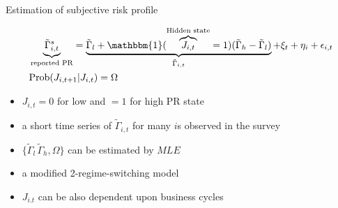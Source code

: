 \documentclass{beamer}
\begin{document}

\begin{frame}{Estimation of subjective 
risk profile}
\label{RegimeEstimation}

\begin{equation*}
	\begin{split}
&	\underbrace{\tilde \Gamma^s_{i,t}}_{\text{reported PR}} = \underbrace{\tilde \Gamma_l + \mathbbm{1}(\overbrace{J_{i,t}}^{\text{Hidden state}}= 1)( \tilde \Gamma_h -\tilde \Gamma_l)}_{\tilde \Gamma_{i,t}} +\xi_{t}+\eta_{i}+ \epsilon_{i,t}\\
& \text{Prob}(J_{i,t+1}|J_{i,t}) = \Omega
\end{split}
\end{equation*}

\begin{itemize}
	
	\item $J_{i,t} =0$ for low and $=1$ for high PR state
	\item a short time series of $\tilde \Gamma_ {i,t}$ for many $i$s observed in the survey 
	\item $\{\tilde \Gamma_l\,\tilde \Gamma_h,\Omega\}$ can be estimated by $MLE$
	\item a modified \cite{hamilton1989new} 2-regime-switching model 
	\item $J_{i.t}$ can be also dependent upon business cycles 
\end{itemize}
\hyperlink{appendix:RegimeEstimationDetail}{} 
\end{frame}
\end{document}
